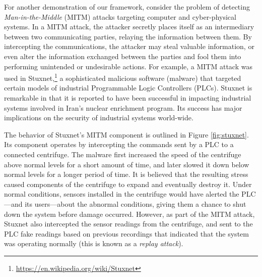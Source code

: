 \documentclass{article}
\begin{document}
For another demonstration of our framework, consider the problem of detecting \emph{Man-in-the-Middle} (MITM) attacks targeting computer and cyber-physical systems.  In a MITM attack, the attacker secretly places itself as an intermediary between two communicating parties, relaying the information between them. By intercepting the communications, the attacker may steal valuable information, or even alter the information exchanged between the parties and fool them into performing unintended or undesirable actions. 
For example, a MITM attack was used in Stuxnet,\footnote{\tiny \url{https://en.wikipedia.org/wiki/Stuxnet}} a sophisticated malicious software (malware) that targeted certain models of industrial Programmable Logic Controllers (PLCs). Stuxnet is remarkable in that it is reported to have been successful in impacting industrial systems involved in Iran's nuclear enrichment program. Its success has major implications on the security  of industrial systems world-wide.

%
\begin{figwindow}
\end{figwindow}
The behavior of Stuxnet's MITM component is outlined in Figure \ref{fig:stuxnet}. Its component operates by intercepting the commands sent by a PLC to a connected centrifuge. The malware first increased the speed of the centrifuge above normal levels for a short amount of time, and later slowed it down below normal levels for a longer period of time. It is believed that the resulting stress caused components of the centrifuge to expand and eventually destroy it. Under normal conditions, sensors installed in the centrifuge would have alerted the PLC---and its users---about the abnormal conditions, giving them a chance to shut down the system before damage occurred. However, as part of the MITM attack, Stuxnet also intercepted the sensor readings from the centrifuge, and sent to the PLC fake readings based on previous recordings that indicated that the system was operating normally (this is known as a \emph{replay attack}). 
\end{document}
